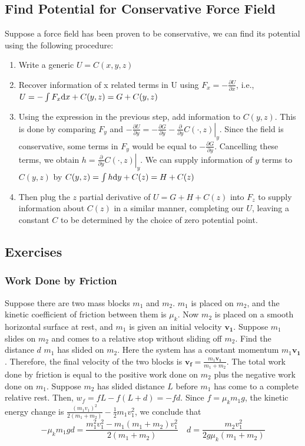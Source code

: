 \documentclass[a4paper,12pt,titlepage]{article}
\begin{document}
\subsection{Find Potential for Conservative Force Field}
Suppose a force field has been proven to be conservative, we can find its potential using the following procedure:
\begin{enumerate}
\item{Write a generic $U=C(x,y,z)$}
\item{Recover information of x related terms in U using $F_x=-\frac{\partial U}{\partial x}$, i.e., $U=-\int F_x\mathrm{d} x+C(y,z)=G+C(y,z)$}
\item{Using the expression in the previous step, add information to $C(y,z)$. This is done by comparing $F_y$ and $-\frac{\partial U}{\partial y}=-\frac{\partial G}{\partial y}-\left.\frac{\partial}{\partial y}C(\cdot,z)\right|_{y}$. Since the field is conservative, some terms in $F_y$ would be equal to $-\frac{\partial G}{\partial y}$. Cancelling these terms, we obtain $h=\left.\frac{\partial}{\partial y}C(\cdot,z)\right|_{y}$. We can supply information of $y$ terms to $C(y,z)$ by $C(y,z)=\int h \mathrm{d} y+C(z)=H+C(z)$}
\item{Then plug the $z$ partial derivative of $U=G+H+C(z)$ into $F_z$ to supply information about $C(z)$ in a similar manner, completing our $U$, leaving a constant $C$ to be determined by the choice of zero potential point.}
\end{enumerate}
\subsection{Exercises}
\subsubsection{Work Done by Friction}
Suppose there are two mass blocks $m_1$ and $m_2$. $m_1$ is placed on $m_2$, and the kinetic coefficient of friction between them is $\mu_k$. Now $m_2$ is placed on a smooth horizontal surface at rest, and $m_1$ is given an initial velocity $\mathbf{v_1}$. Suppose $m_1$ slides on $m_2$ and comes to a relative stop without sliding off $m_2$. Find the distance $d$ $m_1$ has slided on $m_2$.
Here the system has a constant momentum $m_1 \mathbf{v_1}$. Therefore, the final velocity of the two blocks is $\mathbf{v_f}=\frac{m_1\mathbf{v_1}}{m_1+m_2}$. The total work done by friction is equal to the positive work done on $m_2$ plus the negative work done on $m_1$. Suppose $m_2$ has slided distance $L$ before $m_1$ has come to a complete relative rest. Then, $w_f=fL-f(L+d)=-fd$. Since $f=\mu_k m_1 g$, the kinetic energy change is $\frac{(m_1 v_1)^2}{2(m_1+m_2)}-\frac{1}{2}m_1 v_1^2$, we conclude that \[-\mu_k m_1 gd=\frac{m_1^2v_1^2-m_1(m_1+m_2)v_1^2}{2(m_1+m_2)}\quad d=\frac{m_2v_1^2}{2g\mu_k (m_1+m_2)}\]
\end{document}
